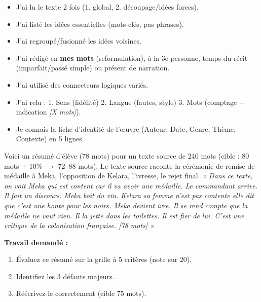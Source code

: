 \documentclass[11pt]{article}
\begin{document}
\begin{aretenir}
\begin{itemize}
    \item [ ] J'ai lu le texte 2 fois (1. global, 2. découpage/idées forces).
    \item [ ] J'ai listé les idées essentielles (mots-clés, pas phrases).
    \item [ ] J'ai regroupé/fusionné les idées voisines.
    \item [ ] J'ai rédigé en \textbf{mes mots} (reformulation), à la 3e personne, temps du récit (imparfait/passé simple) ou présent de narration.
    \item [ ] J'ai utilisé des connecteurs logiques variés.
    \item [ ] J'ai relu : 1. Sens (fidélité) 2. Langue (fautes, style) 3. Mots (comptage + indication \emph{[X mots]}).
    \item [ ] Je connais la fiche d'identité de l'œuvre (Auteur, Date, Genre, Thème, Contexte) en 5 lignes.
\end{itemize}
\end{aretenir}

\begin{exercice}
Voici un résumé d'élève (78 mots) pour un texte source de 240 mots (cible : 80 mots $\pm$ 10\% $\to$ 72--88 mots). Le texte source raconte la cérémonie de remise de médaille à Meka, l'opposition de Kelara, l'ivresse, le rejet final.
\emph{« Dans ce texte, on voit Meka qui est content car il va avoir une médaille. Le commandant arrive. Il fait un discours. Meka boit du vin. Kelara sa femme n'est pas contente elle dit que c'est une honte pour les noirs. Meka devient ivre. Il se rend compte que la médaille ne vaut rien. Il la jette dans les toilettes. Il est fier de lui. C'est une critique de la colonisation française. [78 mots] »}

\textbf{Travail demandé :}
\begin{enumerate}
    \item Évaluez ce résumé sur la grille à 5 critères (note sur 20).
    \item Identifiez les 3 défauts majeurs.
    \item Réécrivez-le correctement (cible 75 mots).
\end{enumerate}
\end{exercice}
\end{document}
